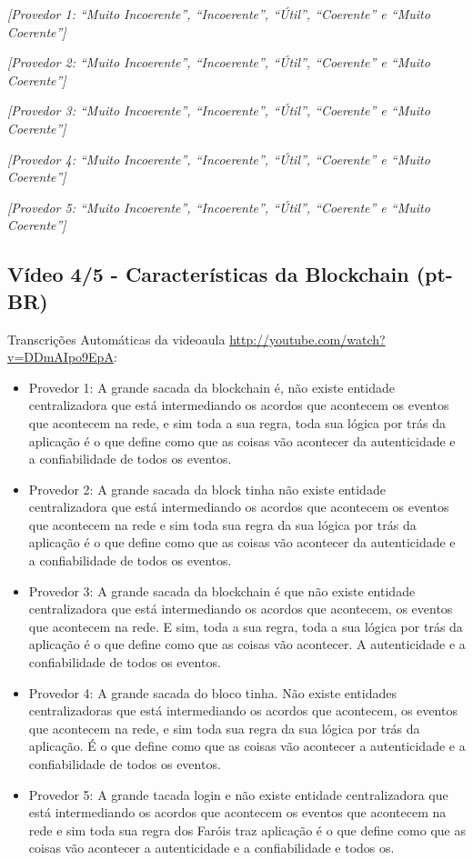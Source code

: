 \noindent
\textit{[Provedor 1: ``Muito Incoerente'', ``Incoerente'', ``Útil'', ``Coerente'' e ``Muito Coerente'']}

\noindent
\textit{[Provedor 2: ``Muito Incoerente'', ``Incoerente'', ``Útil'', ``Coerente'' e ``Muito Coerente'']}

\noindent
\textit{[Provedor 3: ``Muito Incoerente'', ``Incoerente'', ``Útil'', ``Coerente'' e ``Muito Coerente'']}

\noindent
\textit{[Provedor 4: ``Muito Incoerente'', ``Incoerente'', ``Útil'', ``Coerente'' e ``Muito Coerente'']}

\noindent
\textit{[Provedor 5: ``Muito Incoerente'', ``Incoerente'', ``Útil'', ``Coerente'' e ``Muito Coerente'']}

\subsection{Vídeo 4/5 - Características da Blockchain (pt-BR)}

\noindent
Transcrições Automáticas da videoaula \url{http://youtube.com/watch?v=DDmAIpo9EpA}:

\begin{itemize}
    \item Provedor 1: A grande sacada da blockchain é, não existe entidade centralizadora que está intermediando os acordos que acontecem os eventos que acontecem na rede, e sim toda a sua regra, toda sua lógica por trás da aplicação é o que define como que as coisas vão acontecer da autenticidade e a confiabilidade de todos os eventos.
    \item Provedor 2: A grande sacada da block tinha não existe entidade centralizadora que está intermediando os acordos que acontecem os eventos que acontecem na rede e sim toda sua regra da sua lógica por trás da aplicação é o que define como que as coisas vão acontecer da autenticidade e a confiabilidade de todos os eventos.
    \item Provedor 3: A grande sacada da blockchain é que não existe entidade centralizadora que está intermediando os acordos que acontecem, os eventos que acontecem na rede. E sim, toda a sua regra, toda a sua lógica por trás da aplicação é o que define como que as coisas vão acontecer. A autenticidade e a confiabilidade de todos os eventos.
    \item Provedor 4: A grande sacada do bloco tinha. Não existe entidades centralizadoras que está intermediando os acordos que acontecem, os eventos que acontecem na rede, e sim toda sua regra da sua lógica por trás da aplicação. É o que define como que as coisas vão acontecer a autenticidade e a confiabilidade de todos os eventos.
    \item Provedor 5: A grande tacada login e não existe entidade centralizadora que está intermediando os acordos que acontecem os eventos que acontecem na rede e sim toda sua regra dos Faróis traz aplicação é o que define como que as coisas vão acontecer a autenticidade e a confiabilidade e todos os.
\end{itemize}

